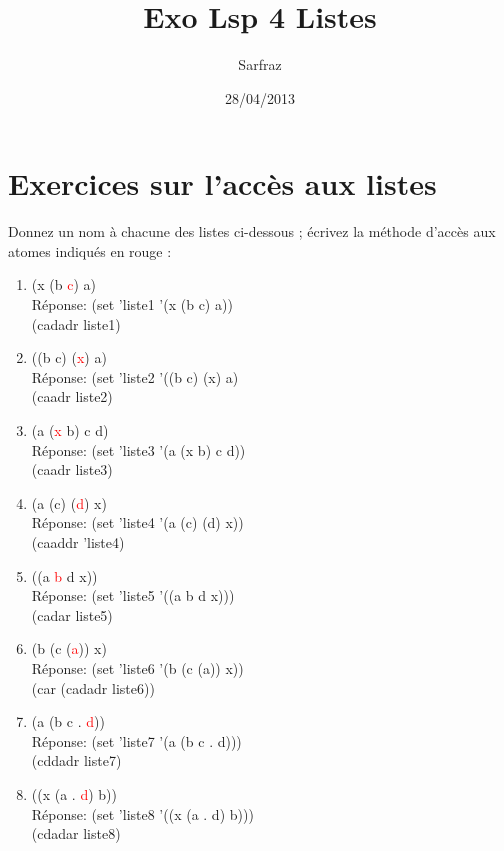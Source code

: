 \documentclass[a4paper, 11pt]{article}
\title{Exo Lsp 4 Listes}
\author{Sarfraz \bsc{kapasi}}
\date{28/04/2013}
\newcommand{\inred}[1]{\textcolor{red}{#1}}
\begin{document}
%
\maketitle
%
\section{Exercices sur l'accès aux listes}
Donnez un nom à chacune des listes ci-dessous ; écrivez la méthode d'accès aux atomes indiqués en rouge :
\begin{enumerate}
    \item (x (b \inred{c}) a)\\
Réponse: (set 'liste1 '(x (b c) a))\\
         (cadadr liste1)
    \item ((b c) (\inred{x}) a)\\
Réponse: (set 'liste2 '((b c) (x) a)\\
         (caadr liste2)
    \item (a (\inred{x} b) c d)\\
Réponse: (set 'liste3 '(a (x b) c d))\\
         (caadr liste3)
    \item (a (c) (\inred{d}) x)\\
Réponse: (set 'liste4 '(a (c) (d) x))\\
         (caaddr 'liste4)
    \item ((a \inred{b} d x))\\
Réponse: (set 'liste5 '((a b d x)))\\
         (cadar liste5)
    \item (b (c (\inred{a})) x)\\
Réponse: (set 'liste6 '(b (c (a)) x))\\
         (car (cadadr liste6))
    \item (a (b c . \inred{d}))\\
Réponse: (set 'liste7 '(a (b c . d)))\\
         (cddadr liste7)
    \item ((x (a . \inred{d}) b))\\
Réponse: (set 'liste8 '((x (a . d) b)))\\
         (cdadar liste8)
\end{enumerate}
%
\end{document}
